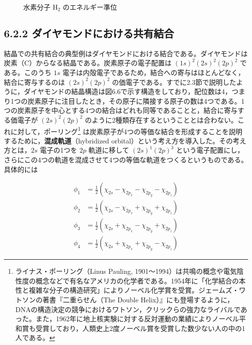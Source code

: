 \documentclass[a4paper,11pt]{ltjsarticle}
\begin{document}
\begin{figure}[h]
  \centering
  \caption{水素分子 $\mathrm{H_2}$ のエネルギー準位}
\end{figure}

\subsection{6.2.2 ダイヤモンドにおける共有結合}

結晶での共有結合の典型例はダイヤモンドにおける結合である。ダイヤモンドは炭素（C）からなる結晶である。炭素原子の電子配置は
$(1s)^2(2s)^2(2p)^2$
である。このうち $1s$ 電子は内殻電子であるため，結合への寄与はほとんどなく，結合に寄与するのは $(2s)^2(2p)^2$ の価電子である。すでに2.3節で説明したように，ダイヤモンドの結晶構造は図6.6で示す構造をしており，配位数は4，つまり1つの炭素原子に注目したとき，その原子に隣接する原子の数は4つである。1つの炭素原子を中心とする4つの結合はどれも同等であることと，結合に寄与する価電子が $(2s)^2(2p)^2$ のように2種類存在するということとは合わない。これに対して，ポーリング\footnote{ライナス・ポーリング（Linus Pauling, 1901～1994）は共鳴の概念や電気陰性度の概念などで有名なアメリカの化学者である。1954年に「化学結合の本性と複雑な分子の構造研究」によりノーベル化学賞を受賞。ジェームズ・ワトソンの著書『二重らせん（The Double Helix）』にも登場するように，DNAの構造決定の競争におけるワトソン，クリックらの強力なライバルであった。また，1962年に地上核実験に対する反対運動の業績によりノーベル平和賞も受賞しており，人類史上2度ノーベル賞を受賞した数少ない人の中の1人である。}
は炭素原子が4つの等価な結合を形成することを説明するために，\textbf{混成軌道}（hybridized orbital）という考え方を導入した。その考え方とは，$2s$ 電子の1つを $2p$ 軌道に移して $(2s)^1(2p)^3$ という電子配置にし，さらにこの4つの軌道を混成させて4つの等価な軌道をつくるというものである。具体的には

\begin{align}
\phi_1 &= \frac{1}{2}(\chi_{2s} - \chi_{2p_x} - \chi_{2p_y} - \chi_{2p_z}) \tag{6.13}\\
\phi_2 &= \frac{1}{2}(\chi_{2s} - \chi_{2p_x} + \chi_{2p_y} + \chi_{2p_z}) \tag{6.14}\\
\phi_3 &= \frac{1}{2}(\chi_{2s} + \chi_{2p_x} - \chi_{2p_y} + \chi_{2p_z}) \tag{6.15}\\
\phi_4 &= \frac{1}{2}(\chi_{2s} + \chi_{2p_x} + \chi_{2p_y} - \chi_{2p_z}) \tag{6.16}
\end{align}
\end{document}
